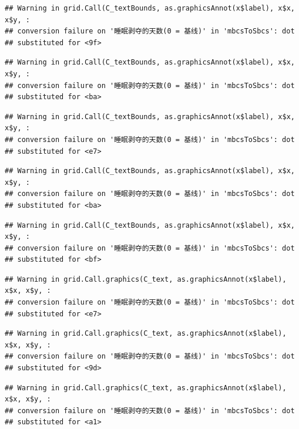 \documentclass[
]{book}
\begin{document}
\begin{verbatim}
## Warning in grid.Call(C_textBounds, as.graphicsAnnot(x$label), x$x, x$y, :
## conversion failure on '睡眠剥夺的天数(0 = 基线)' in 'mbcsToSbcs': dot
## substituted for <9f>
\end{verbatim}

\begin{verbatim}
## Warning in grid.Call(C_textBounds, as.graphicsAnnot(x$label), x$x, x$y, :
## conversion failure on '睡眠剥夺的天数(0 = 基线)' in 'mbcsToSbcs': dot
## substituted for <ba>
\end{verbatim}

\begin{verbatim}
## Warning in grid.Call(C_textBounds, as.graphicsAnnot(x$label), x$x, x$y, :
## conversion failure on '睡眠剥夺的天数(0 = 基线)' in 'mbcsToSbcs': dot
## substituted for <e7>
\end{verbatim}

\begin{verbatim}
## Warning in grid.Call(C_textBounds, as.graphicsAnnot(x$label), x$x, x$y, :
## conversion failure on '睡眠剥夺的天数(0 = 基线)' in 'mbcsToSbcs': dot
## substituted for <ba>
\end{verbatim}

\begin{verbatim}
## Warning in grid.Call(C_textBounds, as.graphicsAnnot(x$label), x$x, x$y, :
## conversion failure on '睡眠剥夺的天数(0 = 基线)' in 'mbcsToSbcs': dot
## substituted for <bf>
\end{verbatim}

\begin{verbatim}
## Warning in grid.Call.graphics(C_text, as.graphicsAnnot(x$label), x$x, x$y, :
## conversion failure on '睡眠剥夺的天数(0 = 基线)' in 'mbcsToSbcs': dot
## substituted for <e7>
\end{verbatim}

\begin{verbatim}
## Warning in grid.Call.graphics(C_text, as.graphicsAnnot(x$label), x$x, x$y, :
## conversion failure on '睡眠剥夺的天数(0 = 基线)' in 'mbcsToSbcs': dot
## substituted for <9d>
\end{verbatim}

\begin{verbatim}
## Warning in grid.Call.graphics(C_text, as.graphicsAnnot(x$label), x$x, x$y, :
## conversion failure on '睡眠剥夺的天数(0 = 基线)' in 'mbcsToSbcs': dot
## substituted for <a1>
\end{verbatim}
\end{document}
